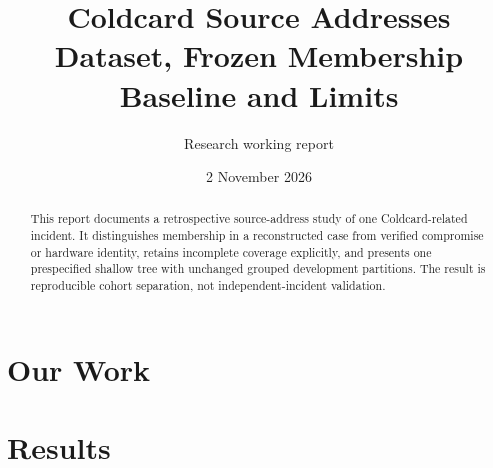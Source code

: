 \documentclass[11pt,a4paper]{article}
\title{Coldcard Source Addresses\\Dataset, Frozen Membership Baseline and Limits}
\author{Research working report}
\date{2 November 2026}
\begin{document}
\maketitle
\begin{abstract}
This report documents a retrospective source-address study of one Coldcard-related incident. It distinguishes membership in a reconstructed case from verified compromise or hardware identity, retains incomplete coverage explicitly, and presents one prespecified shallow tree with unchanged grouped development partitions. The result is reproducible cohort separation, not independent-incident validation.
\end{abstract}
\section{Our Work}

\section{Results}

\end{document}
